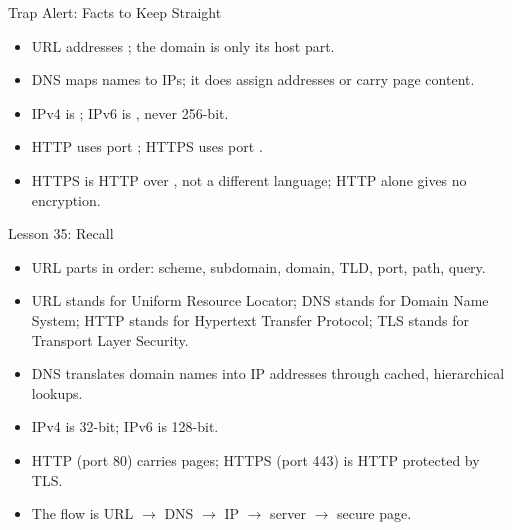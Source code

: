\documentclass[aspectratio=169]{beamer}
\begin{document}
\begin{frame}{Trap Alert: Facts to Keep Straight}
  \begin{itemize}
    \item URL addresses ; the domain is only its host part.
    \item DNS maps names to IPs; it does  assign addresses or carry
      page content.
    \item IPv4 is ; IPv6 is , never 256-bit.
    \item HTTP uses port ; HTTPS uses port .
    \item HTTPS is HTTP over , not a different language; HTTP alone
      gives no encryption.
  \end{itemize}
\end{frame}

\begin{frame}{Lesson 35: Recall}
  \begin{itemize}
    \item URL parts in order: scheme, subdomain, domain, TLD, port, path,
      query.
    \item URL stands for Uniform Resource Locator; DNS stands for Domain
      Name System; HTTP stands for Hypertext Transfer Protocol; TLS stands
      for Transport Layer Security.
    \item DNS translates domain names into IP addresses through cached,
      hierarchical lookups.
    \item IPv4 is 32-bit; IPv6 is 128-bit.
    \item HTTP (port 80) carries pages; HTTPS (port 443) is HTTP protected
      by TLS.
    \item The flow is URL $\rightarrow$ DNS $\rightarrow$ IP $\rightarrow$
      server $\rightarrow$ secure page.
  \end{itemize}
\end{frame}
\end{document}
